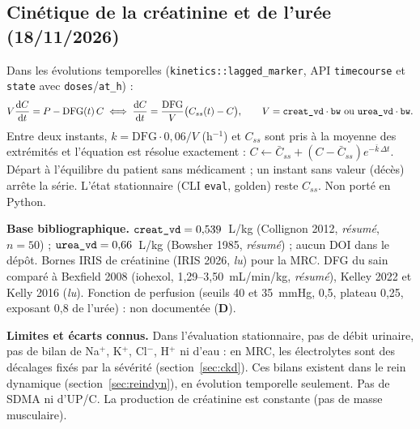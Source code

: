 \documentclass[10pt,a4paper]{article}
\newcommand{\cmd}[1]{\texttt{#1}}
\newcommand{\vp}[1]{\text{\texttt{\detokenize{#1}}}}
\newcommand{\evD}{\textcolor{red!70!black}{\textbf{D}}}
\newcommand{\acc}[1]{\textsl{#1}}
\newcommand{\limite}[1]{\par\textbf{Limites et écarts connus.} #1}
\newcommand{\sources}[1]{\par\textbf{Base bibliographique.} #1}
\newcommand{\dd}{\mathrm{d}}
\begin{document}
\subsection{Cinétique de la créatinine et de l'urée (18/11/2026)}
Dans les évolutions temporelles (\cmd{kinetics::lagged\_marker}, API \cmd{timecourse} et \cmd{state} avec \cmd{doses}/\cmd{at\_h}) :
\begin{equation}
V\frac{\dd C}{\dd t} = P - \text{DFG}(t)\,C \iff \frac{\dd C}{\dd t} = \frac{\text{DFG}}{V}\bigl(C_{ss}(t) - C\bigr),\qquad V = \vp{creat_vd}\cdot\vp{bw}\ \text{ou}\ \vp{urea_vd}\cdot\vp{bw}.
\end{equation}
Entre deux instants, $k = \text{DFG}\cdot 0{,}06/V$ (h$^{-1}$) et $C_{ss}$ sont pris à la moyenne des extrémités et l'équation est résolue exactement : $C \leftarrow \bar C_{ss} + (C - \bar C_{ss})e^{-\bar k\,\Delta t}$. Départ à l'équilibre du patient sans médicament ; un instant sans valeur (décès) arrête la série. L'état stationnaire (CLI \cmd{eval}, golden) reste $C_{ss}$. Non porté en Python.

\sources{$\vp{creat_vd} = 0{,}539$~L/kg (Collignon 2012, \acc{résumé}, $n = 50$) ; $\vp{urea_vd} = 0{,}66$~L/kg (Bowsher 1985, \acc{résumé}) ; aucun DOI dans le dépôt. Bornes IRIS de créatinine (IRIS 2026, \acc{lu}) pour la MRC. DFG du sain comparé à Bexfield 2008 (iohexol, 1,29--3,50~mL/min/kg, \acc{résumé}), Kelley 2022 et Kelly 2016 (\acc{lu}). Fonction de perfusion (seuils 40 et 35~mmHg, 0,5, plateau 0,25, exposant 0,8 de l'urée) : non documentée (\evD{}).}

\limite{Dans l'évaluation stationnaire, pas de débit urinaire, pas de bilan de Na$^+$, K$^+$, Cl$^-$, H$^+$ ni d'eau : en MRC, les électrolytes sont des décalages fixés par la sévérité (section~\ref{sec:ckd}). Ces bilans existent dans le rein dynamique (section~\ref{sec:reindyn}), en évolution temporelle seulement. Pas de SDMA ni d'UP/C. La production de créatinine est constante (pas de masse musculaire).}
\end{document}
